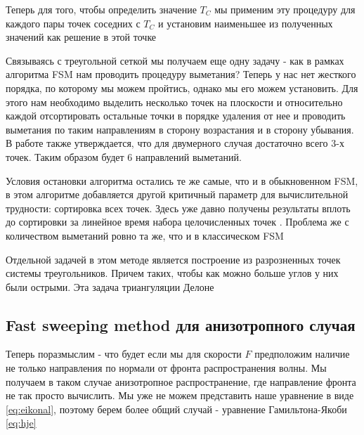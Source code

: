 Теперь для того, чтобы определить значение $T_C$ мы применим эту
процедуру для каждого пары точек соседних с $T_C$ и установим
наименьшее из полученных значений как решение в этой точке

Связываясь с треугольной сеткой мы получаем еще одну задачу - как в
рамках алгоритма FSM нам проводить процедуру выметания? Теперь у нас
нет жесткого порядка, по которому мы можем пройтись, однако мы его
можем установить. Для этого нам необходимо выделить несколько точек на
плоскости и относительно каждой  отсортировать остальные точки в порядке
удаления от нее и проводить выметания по таким направлениям в сторону
возрастания и в сторону убывания. В работе \cite{FS2007} также
утверждается, что для двумерного случая достаточно всего 3-х
точек. Таким образом будет 6 направлений выметаний.

Условия остановки алгоритма остались те же самые, что и в обыкновенном
FSM, в этом алгоритме добавляется другой критичный параметр для
вычислительной трудности: сортировка всех точек. Здесь уже давно
получены результаты вплоть до сортировки за линейное время набора
целочисленных точек \cite{K2017}. Проблема же с количеством выметаний
ровно та же, что и в классическом FSM

Отдельной задачей в этом методе является построение из разрозненных
точек системы треугольников. Причем таких, чтобы как можно больше
углов у них были острыми. Эта задача триангуляции Делоне \cite{T2002}




\subsection{Fast sweeping method для анизотропного случая}

Теперь поразмыслим - что будет если мы для скорости $F$ предположим
наличие не только направления по нормали от фронта распространения
волны. Мы получаем в таком случае анизотропное распространение, где
направление фронта не так просто вычислить. Мы уже не можем
представить наше уравнение в виде \eqref{eq:eikonal}, поэтому берем более
общий случай - уравнение Гамильтона-Якоби \eqref{eq:hje}

